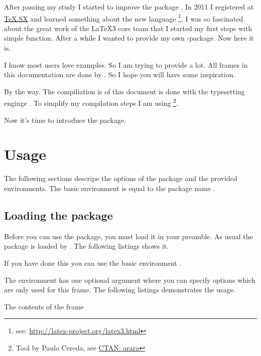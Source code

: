\documentclass[openany,12pt,tocdepth=3,showframe]{ltx-md}
\begin{document}
After passing my study I started to improve the package . In 2011 
I registered at \href{http://tex.stackexchange.com/}{TeX.SX}  and learned something
about the new language \footnote{see: 
\href{http://latex-project.org/latex3.html}{http://latex-project.org/latex3.html}}. 
I was so fascinated about the great work of the \LaTeX3 core team that I started 
my first steps with simple function. After a while I wanted to provide my
own -package. Now here it is.

I know most users love examples. So I am trying to provide a lot. All
frames in this documentation are done by . So I hope
you will have some inspiration.

\vfill
By the way. The compiliation is of this document is done with the
typesetting enginge \LuaLaTeX. To simplify my compilation steps
I am using \footnote{Tool  by Paulo Cereda, 
see \href{http://www.ctan.org/pkg/arara}{CTAN: arara}}.

\vfill
Now it's time to introduce the package.



\chapter{Usage}\label{chap:usage}
The following sections descripe the options of the package and the provided 
environments. The basic environment is equal to the package name .

\section{Loading the package}
Before you can use the package, you must load it in your preamble. As usual the 
package is loaded by . The following listings shows it.
\begin{ltxexample}[caption=Loading the package,label=loading]
 \usepackage{xframed}
\end{ltxexample}
If you have done this you can use the basic environment .

The environment has one optional argument where you can specify options
which are only used for this frame. The following listings demonstrates the usage.
\begin{ltxexample}[caption=Loading the package,label=loading]
 \begin{xframed}
   The contents of the frame
 \end{xframed}
\end{ltxexample}
\end{document}
